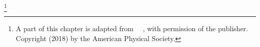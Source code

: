 \footnote[2]{A part of this chapter is adapted from ~\cite{bilayer2018}~, with permission of the publisher. Copyright (2018) by the American Physical Society.}